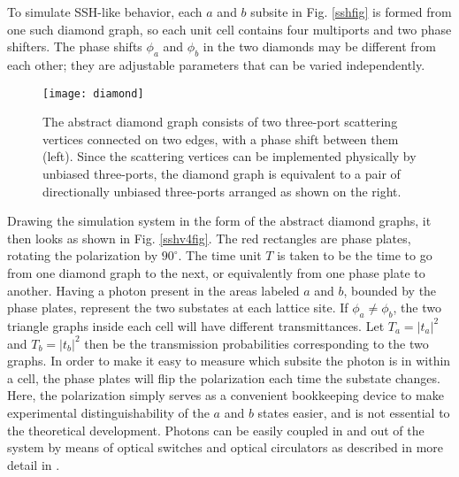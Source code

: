 \documentclass[twocolumn,amsmath, amssymb, superscriptaddress, pra]{revtex4}
\begin{document}
To simulate SSH-like behavior, each $a$ and $b$ subsite in Fig. \ref{sshfig}
is formed from one such diamond graph, so each unit cell contains four
multiports and two phase shifters. The phase shifts $\phi_a$ and $\phi_b$ in
the two diamonds may be different from each other; they are adjustable
parameters that can be varied independently.


\begin{figure}%
\centering
\texttt{[image: diamond]}
\caption{The abstract diamond graph \cite{fh1,fh2,fh3} consists of
two three-port scattering vertices connected on two edges,
with a phase shift between them (left). Since the scattering vertices can be
implemented physically by unbiased three-ports, the diamond graph is
equivalent to a pair of directionally unbiased three-ports arranged as shown
on the right.}
\label{diamfig}
\end{figure}



Drawing the simulation system in the form of the abstract diamond graphs, it
then looks as shown in Fig. \ref{sshv4fig}. The red rectangles are phase
plates, rotating the polarization by $90^\circ$. The time unit $T$ is taken
to be the time to go from one diamond graph to the next, or equivalently from
one phase plate to another. Having a photon present in the areas labeled $a$
and $b$, bounded by the phase plates, represent the two substates at each
lattice site. If $\phi_a\ne\phi_b$, the two triangle graphs inside each cell
will have different transmittances. Let $T_a=|t_a|^2$ and $T_b=|t_b|^2$ then
be the transmission probabilities corresponding to the two graphs. In order
to make it easy to measure which subsite the photon is in within a cell, the
phase plates will flip the polarization each time the substate changes. Here,
the polarization simply serves as a convenient bookkeeping device to make
experimental distinguishability of the $a$ and $b$ states easier, and is not
essential to the theoretical development. Photons can be easily coupled in
and out of the system by means of optical switches and optical circulators as
described in more detail in \cite{simham}.
\end{document}
